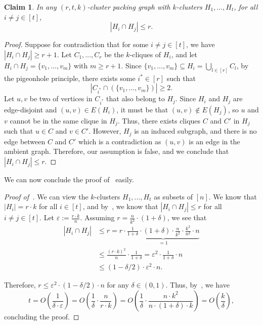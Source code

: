 \documentclass[11pt]{article}
\newtheorem{claim}[lemma]{Claim}
\theoremstyle{definition}
\renewcommand{\leq}{\leqslant}
\renewcommand{\geq}{\geqslant}
\newcommand{\paren}[1]{\ensuremath{\left(#1\right)}\xspace}
\begin{document}
\begin{claim}\label{claim:kCluster-intersection-size}
	In any $(r, t, k)$-cluster packing graph with $k$-clusters $H_1, \ldots, H_t$, for all $i\ne j\in [t]$, 
	\[
	\left|H_i\cap H_j\right| \leq r.
	\]
\end{claim}
\begin{proof}
	Suppose for contradiction that for some $i\ne j\in [t]$, we have
	$
	\left|H_i\cap H_j\right| \geq r+1.
	$
	Let $C_1, \ldots, C_r$ be the $k$-cliques of $H_i$, and let $H_i\cap H_j =\{v_1, \ldots, v_m\}$ with $m\geq r+1$. Since $\{v_1, \ldots, v_m\} \subseteq H_i = \bigcup_{l\in [r]}C_l$, by the pigeonhole principle, there exists some $i^*\in [r]$ such that
	 \[
	 \left|C_{i^*}\cap (\{v_1, \ldots, v_m\})\right| \geq 2.
	 \]
	Let $u, v$ be two of vertices in $C_{i^*}$ that also belong to $H_j$. Since $H_i$ and $H_j$ are edge-disjoint and $(u, v)\in E(H_i)$, it must be that $(u, v) \notin E(H_j)$, so $u$ and $v$ cannot be in the same clique in $H_j$. Thus, there exists cliques $C$ and $C'$ in $H_j$ such that $u\in C$ and $v\in C'$. However, $H_j$ is an induced subgraph, and there is no edge between $C$ and $C'$ which is a contradiction as $(u, v)$ is an edge in the ambient graph. 
	Therefore, our assumption is false, and we conclude that $\left|H_i \cap H_j\right| \leq r$.
\end{proof}

We can now conclude the proof of~ easily. 

\begin{proof}[Proof of~]
	We can view the $k$-clusters $H_1, \ldots, H_t$ as subsets of $[n]$. We know that 
	$\left|H_i\right|=r\cdot k$ for all $i\in [t]$, and by~, we know that $\left|H_i\cap H_j\right|\leq r$ for all $i\ne j\in [t]$.  
    Let $\varepsilon := \frac{r\cdot k}{n}$. Assuming $r = \frac{n}{k^2} \cdot (1+\delta)$, we see that
    \begin{align*}
        \left|H_i\cap H_j\right|
        &\leq r = r \cdot \underbrace{\frac{1}{1+\delta} \cdot (1+\delta) \cdot \frac{n}{k^2} \cdot \frac{k^2}{n^2} \cdot n}_{=1}\\
        & \leq \frac{(r\cdot k)^2}{n} \cdot \frac1{1+\delta} = \varepsilon^2\cdot \frac{1}{1+\delta}\cdot n  \tag{by the choice of $r$ and $\varepsilon$} \\
        &\leq (1-\delta/2) \cdot \varepsilon^2 \cdot n. \tag{as $\delta \in (0,1)$} 
    \end{align*}
    
    Therefore, $r \leq \varepsilon^2 \cdot (1-\delta/2)\cdot n$ for any $\delta\in (0, 1)$. Thus, by~, we have 
    \[
    t = O\paren{\frac{1}{\delta\cdot \varepsilon}} = O\paren{ \frac{1}{\delta} \cdot \frac{n}{r \cdot k}} = O\paren{\frac{1}{\delta} \cdot \frac{n \cdot k^2}{n \cdot (1+\delta) \cdot k}} = O\paren{\frac{k}{\delta}},
    \]
    concluding the proof. 
\end{proof}
\end{document}
